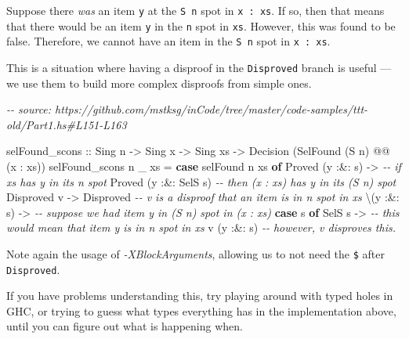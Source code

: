 \documentclass[]{article}
\newenvironment{Shaded}{}{}
\newcommand{\CommentTok}[1]{\textcolor[rgb]{0.38,0.63,0.69}{\textit{#1}}}
\newcommand{\DataTypeTok}[1]{\textcolor[rgb]{0.56,0.13,0.00}{#1}}
\newcommand{\KeywordTok}[1]{\textcolor[rgb]{0.00,0.44,0.13}{\textbf{#1}}}
\newcommand{\NormalTok}[1]{#1}
\newcommand{\OperatorTok}[1]{\textcolor[rgb]{0.40,0.40,0.40}{#1}}
\newcommand{\OtherTok}[1]{\textcolor[rgb]{0.00,0.44,0.13}{#1}}
\begin{document}
\begin{enumerate}
\begin{itemize}
    Suppose there \emph{was} an item \texttt{y} at the
    \texttt{\textquotesingle{}S\ n} spot in \texttt{x\ \textquotesingle{}:\ xs}.
    If so, then that means that there would be an item \texttt{y} in the
    \texttt{n} spot in \texttt{xs}. However, this was found to be false.
    Therefore, we cannot have an item in the \texttt{\textquotesingle{}S\ n}
    spot in \texttt{x\ \textquotesingle{}:\ xs}.

    This is a situation where having a disproof in the \texttt{Disproved} branch
    is useful --- we use them to build more complex disproofs from simple ones.
  \end{itemize}

\begin{Shaded}
\begin{Highlighting}[]
\CommentTok{{-}{-} source: https://github.com/mstksg/inCode/tree/master/code{-}samples/ttt{-}old/Part1.hs\#L151{-}L163}

\NormalTok{selFound\_scons}
\OtherTok{    ::} \DataTypeTok{Sing}\NormalTok{ n}
    \OtherTok{{-}\textgreater{}} \DataTypeTok{Sing}\NormalTok{ x}
    \OtherTok{{-}\textgreater{}} \DataTypeTok{Sing}\NormalTok{ xs}
    \OtherTok{{-}\textgreater{}} \DataTypeTok{Decision}\NormalTok{ (}\DataTypeTok{SelFound}\NormalTok{ (}\DataTypeTok{\textquotesingle{}S}\NormalTok{ n) }\OperatorTok{@@}\NormalTok{ (x \textquotesingle{}}\OperatorTok{:}\NormalTok{ xs))}
\NormalTok{selFound\_scons n \_ xs }\OtherTok{=} \KeywordTok{case}\NormalTok{ selFound n xs }\KeywordTok{of}
    \DataTypeTok{Proved}\NormalTok{ (y }\OperatorTok{:\&:}\NormalTok{ s) }\OtherTok{{-}\textgreater{}}       \CommentTok{{-}{-} if xs has y in its n spot}
      \DataTypeTok{Proved}\NormalTok{ (y }\OperatorTok{:\&:} \DataTypeTok{SelS}\NormalTok{ s)   }\CommentTok{{-}{-} then (x : xs) has y in its (S n) spot}
    \DataTypeTok{Disproved}\NormalTok{ v      }\OtherTok{{-}\textgreater{}} \DataTypeTok{Disproved} \CommentTok{{-}{-} v is a disproof that an item is in n spot in xs}
\NormalTok{      \textbackslash{}(y }\OperatorTok{:\&:}\NormalTok{ s) }\OtherTok{{-}\textgreater{}}      \CommentTok{{-}{-} suppose we had item y in (S n) spot in (x : xs)}
        \KeywordTok{case}\NormalTok{ s }\KeywordTok{of}
          \DataTypeTok{SelS}\NormalTok{ s\textquotesingle{} }\OtherTok{{-}\textgreater{}}     \CommentTok{{-}{-} this would mean that item \textquotesingle{}y\textquotesingle{} is in \textquotesingle{}n\textquotesingle{} spot in xs}
\NormalTok{            v (y }\OperatorTok{:\&:}\NormalTok{ s\textquotesingle{}) }\CommentTok{{-}{-} however, v disproves this.}
\end{Highlighting}
\end{Shaded}

  Note again the usage of \emph{-XBlockArguments}, allowing us to not need the
  \texttt{\$} after \texttt{Disproved}.

  If you have problems understanding this, try playing around with typed holes
  in GHC, or trying to guess what types everything has in the implementation
  above, until you can figure out what is happening when.
\end{enumerate}
\end{document}
